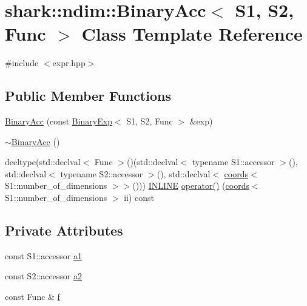 \hypertarget{classshark_1_1ndim_1_1_binary_acc}{}\section{shark\+:\+:ndim\+:\+:Binary\+Acc$<$ S1, S2, Func $>$ Class Template Reference}
\label{classshark_1_1ndim_1_1_binary_acc}


{\ttfamily \#include $<$expr.\+hpp$>$}

\subsection*{Public Member Functions}
\begin{DoxyCompactItemize}
\item 
\hyperlink{classshark_1_1ndim_1_1_binary_acc_aa7c63a66a1512bfac1e10078b309d68d}{Binary\+Acc} (const \hyperlink{classshark_1_1ndim_1_1_binary_exp}{Binary\+Exp}$<$ S1, S2, Func $>$ \&exp)
\item 
\hyperlink{classshark_1_1ndim_1_1_binary_acc_ac44c7e3de12bdbf2c5051a641cb25e40}{$\sim$\+Binary\+Acc} ()
\item 
decltype(std\+::declval$<$ Func $>$()(std\+::declval$<$ typename S1\+::accessor $>$(), std\+::declval$<$ typename S2\+::accessor $>$(), std\+::declval$<$ \hyperlink{structshark_1_1ndim_1_1coords}{coords}$<$ S1\+::number\+\_\+of\+\_\+dimensions $>$$>$())) \hyperlink{common_8hpp_a2eb6f9e0395b47b8d5e3eeae4fe0c116}{I\+N\+L\+I\+NE} \hyperlink{classshark_1_1ndim_1_1_binary_acc_a61bcee2ed74f523bb95a2525b522d6fb}{operator()} (\hyperlink{structshark_1_1ndim_1_1coords}{coords}$<$ S1\+::number\+\_\+of\+\_\+dimensions $>$ ii) const
\end{DoxyCompactItemize}
\subsection*{Private Attributes}
\begin{DoxyCompactItemize}
\item 
const S1\+::accessor \hyperlink{classshark_1_1ndim_1_1_binary_acc_ad506fa496dc01e94b8e40cce878d55e4}{a1}
\item 
const S2\+::accessor \hyperlink{classshark_1_1ndim_1_1_binary_acc_a85cdf9eb043152a0c54bf58809edf165}{a2}
\item 
const Func \& \hyperlink{classshark_1_1ndim_1_1_binary_acc_ab0c1983b8ee09760742353828229262f}{f}
\end{DoxyCompactItemize}


